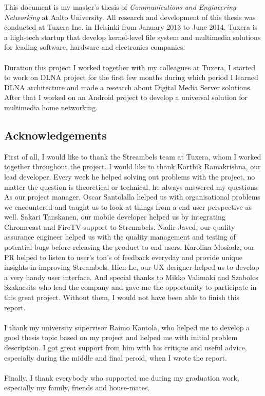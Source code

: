 
This document is my master's thesis of \textit{Communications and Engineering
Networking} at Aalto University. All research and development of this thesis was
conducted at Tuxera Inc. in Helsinki from January 2013 to June 2014. Tuxera is a
high-tech startup that develop kernel-level file system and multimedia solutions
for leading software, hardware and electronics companies.\\
\\
Duration this project I worked together with my colleagues at Tuxera, I started
to work on DLNA project for the first few months during which period I learned
DLNA architecture and made a research about Digital Media Server solutions.
After that I worked on an Android project to develop a universal solution for
multimedia home networking.
\subsection*{Acknowledgements}
First of all, I would like to thank the Streambels team at Tuxera, whom I worked
together throughout the project. I would like to thank Karthik Ramakrishna, our
lead developer. Every week he helped solving out problems with the project,
no matter the question is theoretical or technical, he always answered my
questions. As our project manager, Oscar Santolalla helped us with
organisational problems we encountered and taught us to look at things from a
end user perspective as well. Sakari Tanskanen, our mobile developer helped us
by integrating Chromecast and FireTV support to Stremabels. Nadir Javed, our
quality assurance engineer helped us with the quality management and testing of
potential bugs before releasing the product to end users. Karolina Mosiadz, our
PR helped to listen to user's ton's of feedback everyday and provide unique
insights in improving Streambels. Hien Le, our UX designer helped us to develop
a very handy user interface. And special thanks to Mikko Valimaki and Szabolcs
Szakacsits who lead the company and gave me the opportunity to participate in
this great project. Without them, I would not have been able to finish this
report.\\
\\
I thank my university supervisor Raimo Kantola, who helped me to develop a good
thesis topic based on my project and helped me with initial problem description.
I got great support from him with his critique and useful advice, especially
during the middle and final peroid, when I wrote the report.\\
\\
Finally, I thank everybody who supported me during my graduation work,
especially my family, friends and house-mates.
